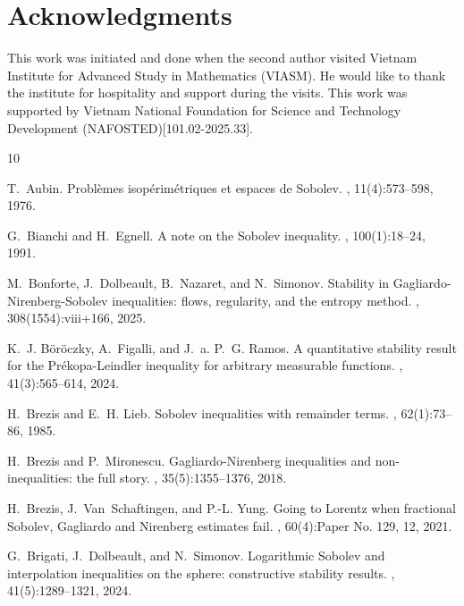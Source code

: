 \documentclass[a4paper,12pt]{article}
\theoremstyle{plain}
\theoremstyle{definition}
\theoremstyle{remark}
\numberwithin{equation}{section}
\begin{document}
\section*{Acknowledgments}
This work was initiated and done when the second author visited Vietnam Institute for Advanced Study in Mathematics (VIASM). He would like to thank the institute for hospitality and support during the visits. This work was supported by Vietnam National Foundation for Science and Technology Development (NAFOSTED)[101.02-2025.33].

%
\begin{thebibliography}{10}

T.~Aubin.
\newblock Probl\`emes isop\'erim\'etriques et espaces de {S}obolev.
, 11(4):573--598, 1976.

G.~Bianchi and H.~Egnell.
\newblock A note on the {S}obolev inequality.
, 100(1):18--24, 1991.

M.~Bonforte, J.~Dolbeault, B.~Nazaret, and N.~Simonov.
\newblock Stability in {G}agliardo-{N}irenberg-{S}obolev inequalities: flows,
  regularity, and the entropy method.
, 308(1554):viii+166, 2025.

K.~J. B\"or\"oczky, A.~Figalli, and J.~a. P.~G. Ramos.
\newblock A quantitative stability result for the {P}r\'ekopa-{L}eindler
  inequality for arbitrary measurable functions.
,
  41(3):565--614, 2024.

H.~Brezis and E.~H. Lieb.
\newblock Sobolev inequalities with remainder terms.
, 62(1):73--86, 1985.

H.~Brezis and P.~Mironescu.
\newblock Gagliardo-{N}irenberg inequalities and non-inequalities: the full
  story.
,
  35(5):1355--1376, 2018.

H.~Brezis, J.~Van~Schaftingen, and P.-L. Yung.
\newblock Going to {L}orentz when fractional {S}obolev, {G}agliardo and
  {N}irenberg estimates fail.
, 60(4):Paper No. 129,
  12, 2021.

G.~Brigati, J.~Dolbeault, and N.~Simonov.
\newblock Logarithmic {S}obolev and interpolation inequalities on the sphere:
  constructive stability results.
,
  41(5):1289--1321, 2024.


\end{thebibliography}
\end{document}
